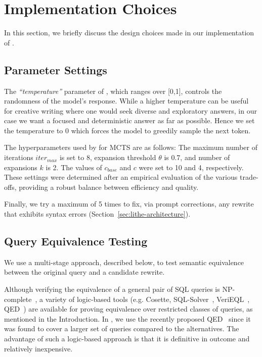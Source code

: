 \section{Implementation Choices}
\label{sec:impl}

In this section, we briefly discuss the design choices made in our implementation of \lithe.

\vspace{-0.1in}
\subsection{\lithe Parameter Settings}
\label{sec:llm-params}

The \emph{``temperature''} parameter of \gpt, which ranges over [0,1], controls the randomness of the model's response.
While a higher temperature can be useful for creative writing where one would seek diverse and exploratory answers, in our case we want a focused and deterministic answer as far as possible. Hence we set the temperature to 0 which forces the model to greedily sample the next token.


The hyperparameters used by \lithe for MCTS are as follows: The maximum number of iterations $iter_{max}$ is set to 8,  expansion threshold $\theta$ is 0.7, and number of expansions $k$ is 2.
The values of $c_{base}$ and $c$ were set to 10 and 4, respectively.
%
These settings were determined after an empirical evaluation of the various trade-offs, providing a robust balance between efficiency and quality.
%

Finally, we try a maximum of 5 times to fix, via prompt corrections, any rewrite that exhibits syntax errors (Section~\ref{sec:lithe-architecture}).

\vspace{-0.1in}
\subsection{Query Equivalence Testing}
\label{sec:sql-equivalence}
We use a multi-stage approach, described below, to test semantic equivalence between the original query and a candidate rewrite.

Although verifying the equivalence of a general pair of SQL queries is NP-complete~\cite{queryequivalence}, a variety of logic-based tools (e.g. Cosette\cite{Cosette}, SQL-Solver~\cite{SQLSolver}, VeriEQL~\cite{verieql}, QED~\cite{QED}) are available for proving equivalence over restricted classes of queries, as mentioned in the Introduction. 
%
In \lithe, we use the recently proposed QED~\cite{QED} since it was found to cover a larger set of queries compared to the alternatives. 
%
The advantage of such a logic-based approach is that it is definitive in outcome and relatively inexpensive. 

